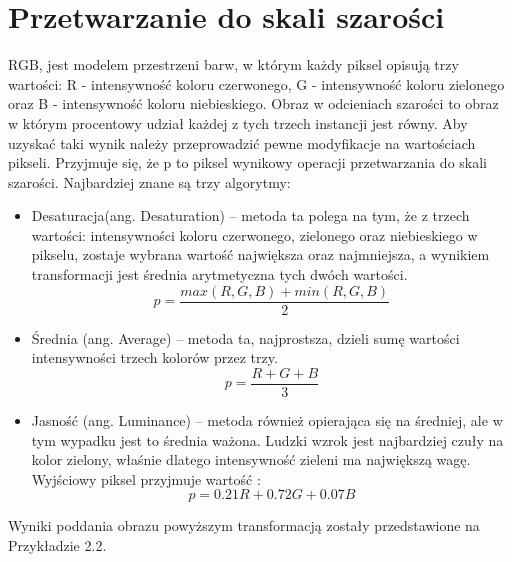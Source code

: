 \documentclass[eng,oneside]{mgr}
\begin{document}
\section{Przetwarzanie do skali szarości}
RGB, jest modelem przestrzeni barw, w którym każdy piksel opisują trzy wartości: R - intensywność koloru czerwonego, G - intensywność koloru zielonego oraz B - intensywność koloru niebieskiego. Obraz w odcieniach szarości to obraz w którym procentowy udział każdej z tych trzech instancji jest równy. Aby uzyskać taki wynik należy przeprowadzić pewne modyfikacje na wartościach pikseli. Przyjmuje się, że p to piksel wynikowy operacji przetwarzania do skali szarości. Najbardziej znane są trzy algorytmy:
\begin{itemize}
\item Desaturacja(ang. Desaturation) – metoda ta polega na tym, że z trzech wartości: intensywności koloru czerwonego, zielonego oraz niebieskiego w pikselu, zostaje wybrana wartość największa oraz najmniejsza, a wynikiem transformacji jest średnia arytmetyczna tych dwóch wartości.
\begin{equation}
p=\frac{max(R,G,B) + min(R,G,B)}{2}
\end{equation}
\item Średnia (ang. Average) – metoda ta, najprostsza, dzieli sumę wartości intensywności trzech kolorów przez trzy.
\begin{equation}
p=\frac{R + G + B}{3}
\end{equation}
\item Jasność (ang. Luminance) – metoda również opierająca się na średniej, ale w tym wypadku jest to średnia ważona. Ludzki wzrok jest najbardziej czuły na kolor zielony, właśnie dlatego intensywność zieleni ma największą wagę. Wyjściowy piksel przyjmuje wartość \cite{grayscale}:
\begin{equation}
p={0.21R + 0.72G + 0.07B}
\end{equation}

\end{itemize} \newpage
\par Wyniki poddania obrazu powyższym transformacją zostały przedstawione na Przykładzie 2.2.
\end{document}
